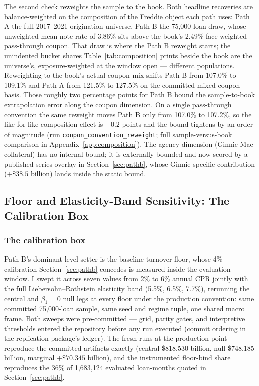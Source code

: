 \documentclass[12pt]{article}
\begin{document}
The second check reweights the sample to the book. Both headline recoveries are balance-weighted on the composition of the Freddie object each path uses: Path A the full 2017--2021 origination universe, Path B the 75,000-loan draw, whose unweighted mean note rate of 3.86\% sits above the book's 2.49\% face-weighted pass-through coupon. That draw is where the Path B reweight starts; the unindented bucket shares Table~\ref{tab:composition} prints beside the book are the universe's, exposure-weighted at the window open --- different populations. Reweighting to the book's actual coupon mix shifts Path B from 107.0\% to 109.1\% and Path A from 121.5\% to 127.5\% on the committed mixed coupon basis. Those roughly two percentage points for Path B bound the sample-to-book extrapolation error along the coupon dimension. On a single pass-through convention the same reweight moves Path B only from 107.0\% to 107.2\%, so the like-for-like composition effect is $+0.2$ points and the bound tightens by an order of magnitude (run \texttt{coupon\_convention\_reweight}; full sample-versus-book comparison in Appendix~\ref{app:composition}). The agency dimension (Ginnie Mae collateral) has no internal bound; it is externally bounded and now scored by a published-series overlay in Section~\ref{sec:pathb}, whose Ginnie-specific contribution ($+\$38.5$ billion) lands inside the static bound.

\subsection{Floor and Elasticity-Band Sensitivity: The Calibration Box}\label{sec:robustness-floor}

\subsubsection{The calibration box}

Path B's dominant level-setter is the baseline turnover floor, whose 4\% calibration Section~\ref{sec:pathb} concedes is measured inside the evaluation window. I swept it across seven values from 2\% to 6\% annual CPR jointly with the full Liebersohn--Rothstein elasticity band (5.5\%, 6.5\%, 7.7\%), rerunning the central and $\beta_1 = 0$ null legs at every floor under the production convention: same committed 75,000-loan sample, same seed and regime tuple, one shared macro frame. Both sweeps were pre-committed --- grid, parity gates, and interpretive thresholds entered the repository before any run executed (commit ordering in the replication package's ledger). The fresh runs at the production point reproduce the committed artifacts exactly (central \$818.530 billion, null \$748.185 billion, marginal $+\$70.345$ billion), and the instrumented floor-bind share reproduces the 36\% of 1,683,124 evaluated loan-months quoted in Section~\ref{sec:pathb}.
\end{document}
